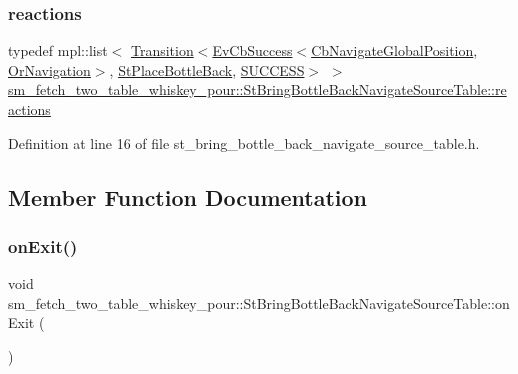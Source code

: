 \subsubsection{\texorpdfstring{reactions}{reactions}}
{\footnotesize\ttfamily typedef mpl\+::list$<$ \hyperlink{classsmacc_1_1Transition}{Transition}$<$\hyperlink{structsmacc_1_1EvCbSuccess}{Ev\+Cb\+Success}$<$\hyperlink{classcl__move__base__z_1_1CbNavigateGlobalPosition}{Cb\+Navigate\+Global\+Position}, \hyperlink{classsm__fetch__two__table__whiskey__pour_1_1OrNavigation}{Or\+Navigation}$>$, \hyperlink{structsm__fetch__two__table__whiskey__pour_1_1StPlaceBottleBack}{St\+Place\+Bottle\+Back}, \hyperlink{structsmacc_1_1default__transition__tags_1_1SUCCESS}{S\+U\+C\+C\+E\+SS}$>$ $>$ \hyperlink{structsm__fetch__two__table__whiskey__pour_1_1StBringBottleBackNavigateSourceTable_a5b1307ce44e008392d71e88bc5ba5d39}{sm\+\_\+fetch\+\_\+two\+\_\+table\+\_\+whiskey\+\_\+pour\+::\+St\+Bring\+Bottle\+Back\+Navigate\+Source\+Table\+::reactions}}



Definition at line 16 of file st\+\_\+bring\+\_\+bottle\+\_\+back\+\_\+navigate\+\_\+source\+\_\+table.\+h.



\subsection{Member Function Documentation}
\mbox{\label{structsm__fetch__two__table__whiskey__pour_1_1StBringBottleBackNavigateSourceTable_a03a3560f9e509cba3c4c6ae40be45d2a}} 
\subsubsection{\texorpdfstring{on\+Exit()}{onExit()}}
{\footnotesize\ttfamily void sm\+\_\+fetch\+\_\+two\+\_\+table\+\_\+whiskey\+\_\+pour\+::\+St\+Bring\+Bottle\+Back\+Navigate\+Source\+Table\+::on\+Exit (\begin{DoxyParamCaption}{ }\end{DoxyParamCaption})\hspace{0.3cm}{\ttfamily [inline]}}



